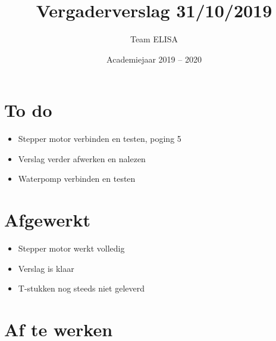 \documentclass[a4paper,kulak]{kulakarticle} %
\date{Academiejaar 2019 -- 2020}
\title{Vergaderverslag 31/10/2019}
\author{Team ELISA}
\begin{document}
	
	\maketitle
	
	\section*{To do}
	
	\begin{itemize}
		\item Stepper motor verbinden en testen, poging 5
		\item Verslag verder afwerken en nalezen
		\item Waterpomp verbinden en testen
		
	\end{itemize}
	
	\section*{Afgewerkt}
	\begin{itemize}
		\item Stepper motor werkt volledig
		\item Verslag is klaar
		\item T-stukken nog steeds niet geleverd
	\end{itemize}
	
	
	\section*{Af te werken}
	
	
\end{document}
